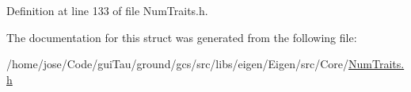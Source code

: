 Definition at line 133 of file Num\-Traits.\-h.



The documentation for this struct was generated from the following file\-:\begin{DoxyCompactItemize}
\item 
/home/jose/\-Code/gui\-Tau/ground/gcs/src/libs/eigen/\-Eigen/src/\-Core/\hyperlink{_num_traits_8h}{Num\-Traits.\-h}\end{DoxyCompactItemize}
